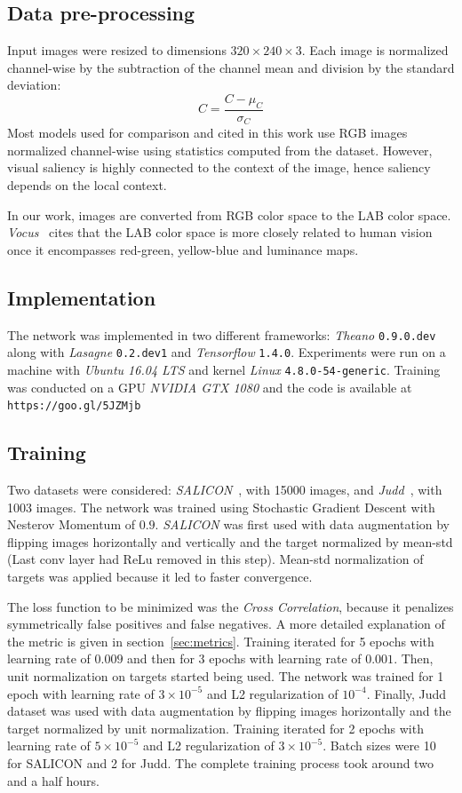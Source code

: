 \documentclass[conference]{IEEEtran}
\begin{document}
\subsection{Data pre-processing}\label{sec:preproc}
Input images were resized to dimensions $320\times240\times3$.
Each image is normalized channel-wise by the subtraction of
the channel mean and division by the standard deviation:
$$C = \frac{C - \mu_C}{\sigma_C}$$
Most models used for comparison and cited in this work use RGB images
normalized channel-wise using statistics computed from the dataset.
However, visual saliency is highly connected to the context of the
image, hence saliency depends on the local context.

In our work, images are converted from RGB color space to the LAB color
space.
\emph{Vocus}~\cite{frintrop_2005} cites that the
LAB color space is more closely related to human vision once it encompasses
red-green, yellow-blue and
luminance maps.

\subsection{Implementation}
The network was implemented in two different frameworks:
\emph{Theano} \texttt{0.9.0.dev} along with \emph{Lasagne} \texttt{0.2.dev1}
and \emph{Tensorflow} \texttt{1.4.0}.
Experiments were run on a machine with \emph{Ubuntu 16.04 LTS} and
kernel \emph{Linux} \texttt{4.8.0-54-generic}.
Training was conducted on a GPU \emph{NVIDIA GTX 1080} and the
code is available at \texttt{https://goo.gl/5JZMjb}

\subsection{Training}
Two datasets were considered:
\emph{SALICON}~\cite{jiang_2015}, with 15000 images, and
\emph{Judd}~\cite{judd}, with 1003 images.
The network was trained using Stochastic Gradient Descent with Nesterov
Momentum of $0.9$.
\emph{SALICON} was first used with data augmentation by flipping images
horizontally and vertically and the target normalized by mean-std
(Last conv layer had ReLu removed in this step).
Mean-std normalization of targets was applied because it led to faster
convergence.

The loss function to be minimized was the \emph{Cross Correlation},
because it penalizes symmetrically false positives and false negatives.
A more detailed explanation of the metric is given in
section~\ref{sec:metrics}.
Training iterated for 5 epochs with learning rate of $0.009$
and then for 3 epochs with learning rate of $0.001$.
Then, unit normalization on targets started being used.
The network was trained for 1 epoch with learning rate of
$3\times10^{-5}$ and L2 regularization of $10^{-4}$. Finally, Judd dataset was used with data augmentation by flipping images horizontally and the target normalized by unit normalization.
Training iterated for 2 epochs with learning rate of
$5\times10^{-5}$ and L2 regularization of $3\times10^{-5}$. Batch sizes were 10 for SALICON and 2 for Judd. The complete training process took around two and a half hours.
\end{document}
